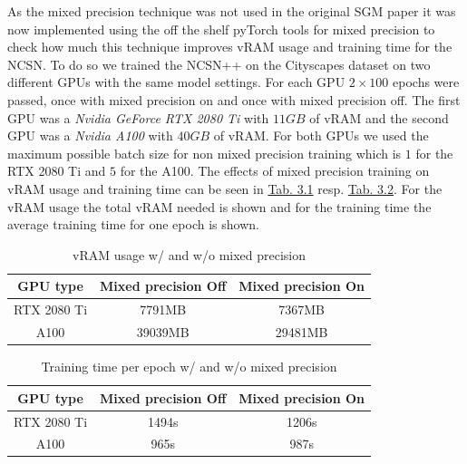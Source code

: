 As the mixed precision technique was not used in the original SGM paper \cite{score_3} it was now implemented using the off the shelf pyTorch tools for mixed precision to check how much this technique improves vRAM usage and training time for the NCSN. To do so we trained the NCSN++ on the Cityscapes dataset on two different GPUs with the same model settings. For each GPU $2\times100$ epochs were passed, once with mixed precision on and once with mixed precision off. The first GPU was a \textit{Nvidia GeForce RTX 2080 Ti} with $11GB$ of vRAM and the second GPU was a \textit{Nvidia A100} with $40GB$ of vRAM. For both GPUs we used the maximum possible batch size for non mixed precision training which is $1$ for the RTX 2080 Ti and $5$ for the A100. The effects of mixed precision training on vRAM usage and training time can be seen in \hyperref[tab:3.1]{Tab. 3.1} resp. \hyperref[tab:3.1]{Tab. 3.2}. For the vRAM usage the total vRAM needed is shown and for the training time the average training time for one epoch is shown.
%
\begin{table}[] \label{tab:3.1}
        \centering
    \begin{tabular}{c|c|c}
        GPU type        & Mixed precision \textbf{Off}    & Mixed precision \textbf{On} \\
        \hline
        RTX 2080 Ti     &  7791MB               & 7367MB\\
        A100            &  39039MB              & 29481MB
    \end{tabular}
    \caption{vRAM usage w/ and w/o mixed precision}
\end{table}
\begin{table}[b] \label{tab:3.2}
        \centering
    \begin{tabular}{c|c|c}
        GPU type        & Mixed precision \textbf{Off}    & Mixed precision \textbf{On} \\
        \hline
        RTX 2080 Ti     &  1494s                & 1206s    \\
        A100            &  965s                 & 987s
    \end{tabular}
    \caption{Training time per epoch w/ and w/o mixed precision}
\end{table}

